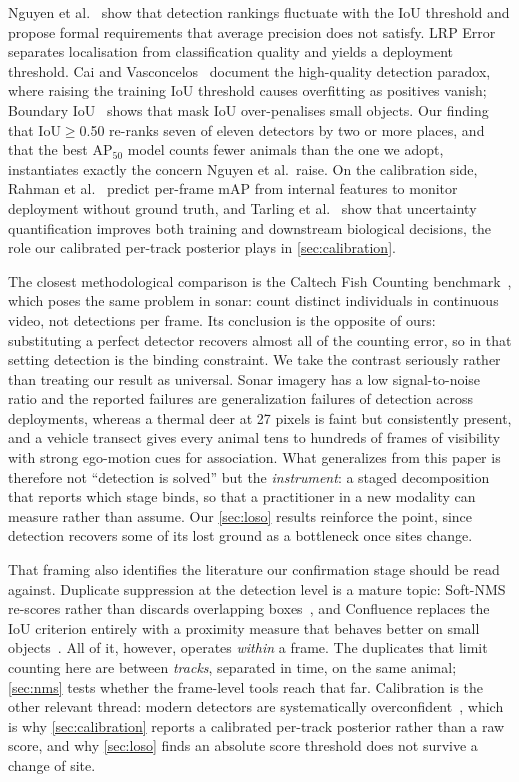 Nguyen et al.~\cite{nguyen2023trustworthy} show that detection rankings fluctuate with the IoU
threshold and propose formal requirements that average precision does not satisfy. LRP
Error~\cite{oksuz2022lrp} separates localisation from classification quality and yields a
deployment threshold. Cai and Vasconcelos~\cite{cai2021cascade} document the high-quality
detection paradox, where raising the training IoU threshold causes overfitting as positives
vanish; Boundary IoU~\cite{cheng2021boundary} shows that mask IoU over-penalises small objects.
Our finding that IoU$\geq$0.50 re-ranks seven of eleven detectors by two or more places, and
that the best AP$_{50}$ model counts fewer animals than the one we adopt, instantiates exactly
the concern Nguyen et al.\ raise. On the calibration side, Rahman et
al.~\cite{rahman2021perframe} predict per-frame mAP from internal features to monitor
deployment without ground truth, and Tarling et al.~\cite{tarling2022deep} show that
uncertainty quantification improves both training and downstream biological decisions, the
role our calibrated per-track posterior plays in \cref{sec:calibration}.
\label{sec:othermodalities}

The closest methodological comparison is the Caltech Fish Counting
benchmark~\cite{kay2022caltech}, which poses the same problem in sonar: count distinct individuals in continuous video, not detections per frame. Its conclusion is the opposite of
ours: substituting a perfect detector recovers almost all of the counting error, so in that
setting detection is the binding constraint. We take the contrast seriously rather than
treating our result as universal. Sonar imagery has a low signal-to-noise ratio and the reported failures are
generalization failures of detection across deployments, whereas a thermal deer at 27 pixels
is faint but consistently present, and a vehicle transect gives every animal tens to hundreds
of frames of visibility with strong ego-motion cues for association. What generalizes from
this paper is therefore not ``detection is solved'' but the \emph{instrument}: a staged
decomposition that reports which stage binds, so that a practitioner in a new modality can
measure rather than assume. Our \cref{sec:loso} results reinforce the point, since detection
recovers some of its lost ground as a bottleneck once sites change.

That framing also identifies the literature our confirmation stage should be read against.
Duplicate suppression at the detection level is a mature topic: Soft-NMS re-scores rather than discards overlapping boxes~\cite{bodla2017softnms}, and Confluence replaces the IoU criterion entirely with a proximity measure that behaves better on small objects~\cite{shuai2021confluence}. All of it, however, operates \emph{within} a frame. The
duplicates that limit counting here are between \emph{tracks}, separated in time, on the same
animal; \cref{sec:nms} tests whether the frame-level tools reach that far. Calibration is the
other relevant thread: modern detectors are systematically overconfident~\cite{guo2017calibration},
which is why \cref{sec:calibration} reports a calibrated per-track posterior rather than a raw
score, and why \cref{sec:loso} finds an absolute score threshold does not survive a change of
site.

